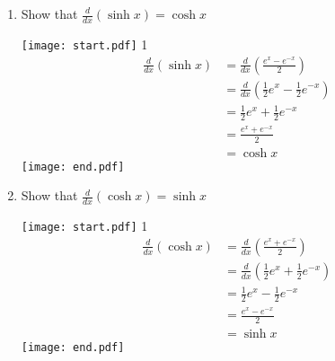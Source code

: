 \documentclass[12pt]{article}
\begin{document}
\begin{enumerate}
\begin{enumerate}
\item Show that $\frac{d}{dx}(\sinh{x})=\cosh{x}$

\texttt{[image: start.pdf]}
{{{1\linewidth}{
\begin{align*}
\frac{d}{dx}(\sinh{x}) &= \frac{d}{dx}\left(\frac{e^x-e^{-x}}{2}\right)\\
&=\frac{d}{dx}\left(\frac{1}{2}e^x-\frac{1}{2}e^{-x}\right)\\
&=\frac{1}{2}e^x+\frac{1}{2}e^{-x}\\
&=\frac{e^x+e^{-x}}{2}\\
&=\cosh{x}
\end{align*}
}}}
\texttt{[image: end.pdf]}


\item Show that $\frac{d}{dx}(\cosh{x})=\sinh{x}$

\texttt{[image: start.pdf]}
{{{1\linewidth}{
\begin{align*}
\frac{d}{dx}(\cosh{x}) &= \frac{d}{dx}\left(\frac{e^x+e^{-x}}{2}\right)\\
&=\frac{d}{dx}\left(\frac{1}{2}e^x+\frac{1}{2}e^{-x}\right)\\
&=\frac{1}{2}e^x-\frac{1}{2}e^{-x}\\
&=\frac{e^x-e^{-x}}{2}\\
&=\sinh{x}
\end{align*}
}}}
\texttt{[image: end.pdf]}


\end{enumerate}

\end{enumerate}
\end{document}
